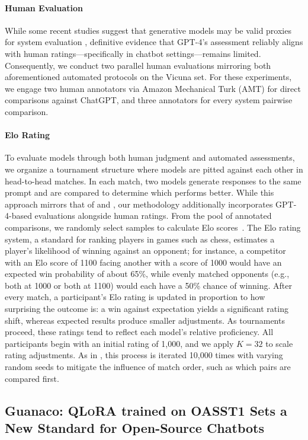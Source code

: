 \paragraph{Human Evaluation} While some recent studies suggest that generative models may be valid proxies for system evaluation \citep{fu2023gptscore}, definitive evidence that GPT-4’s assessment reliably aligns with human ratings—specifically in chatbot settings—remains limited. Consequently, we conduct two parallel human evaluations mirroring both aforementioned automated protocols on the Vicuna set. For these experiments, we engage two human annotators via Amazon Mechanical Turk (AMT) for direct comparisons against ChatGPT, and three annotators for every system pairwise comparison.

\paragraph{Elo Rating} To evaluate models through both human judgment and automated assessments, we organize a tournament structure where models are pitted against each other in head-to-head matches. In each match, two models generate responses to the same prompt and are compared to determine which performs better. While this approach mirrors that of \citet{bai2022training} and \citet{vicuna2023}, our methodology additionally incorporates GPT-4-based evaluations alongside human ratings. From the pool of annotated comparisons, we randomly select samples to calculate Elo scores~\citep{elo1967proposed,elo1978rating}. The Elo rating system, a standard for ranking players in games such as chess, estimates a player's likelihood of winning against an opponent; for instance, a competitor with an Elo score of 1100 facing another with a score of 1000 would have an expected win probability of about 65\%, while evenly matched opponents (e.g., both at 1000 or both at 1100) would each have a 50\% chance of winning. After every match, a participant's Elo rating is updated in proportion to how surprising the outcome is: a win against expectation yields a significant rating shift, whereas expected results produce smaller adjustments. As tournaments proceed, these ratings tend to reflect each model's relative proficiency. All participants begin with an initial rating of 1,000, and we apply $K=32$ to scale rating adjustments. As in \citet{vicuna2023}, this process is iterated 10,000 times with varying random seeds to mitigate the influence of match order, such as which pairs are compared first.

\subsection{\textbf{Guanaco}: \textsc{QLoRA} trained on OASST1 Sets a New Standard for Open-Source Chatbots}

